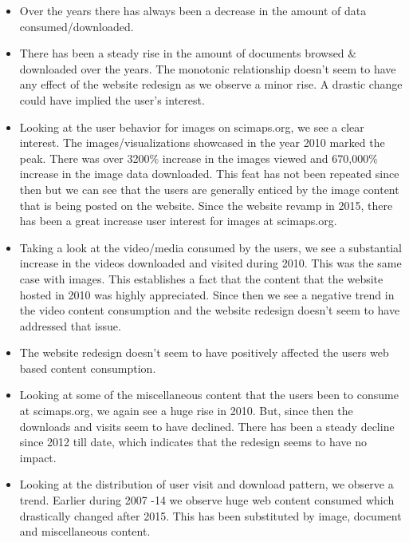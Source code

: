 \begin{itemize}
\item Over the years there has always been a decrease in the amount of data consumed/downloaded. 
\item There has been a steady rise in the amount of documents browsed $\&$ downloaded over the years. The monotonic relationship doesn’t seem to have any effect of the website redesign as we observe a minor rise. A drastic change could have implied the user’s interest. 
\item Looking at the user behavior for images on scimaps.org, we see a clear interest. The images/visualizations showcased in the year 2010 marked the peak. There was over 3200$\%$ increase in the images viewed and 670,000$\%$ increase in the image data downloaded. This feat has not been repeated since then but we can see that the users are generally enticed by the image content that is being posted on the website. Since the website revamp in 2015, there has been a great increase user interest for images at scimaps.org.
\item  Taking a look at the video/media consumed by the users, we see a substantial increase in the videos downloaded and visited during 2010. This was the same case with images. This establishes a fact that the content that the website hosted in 2010 was highly appreciated. Since then we see a negative trend in the video content consumption and the website redesign doesn’t seem to have addressed that issue.
\item The website redesign doesn’t seem to have positively affected the users web based content consumption. 
\item Looking at some of the miscellaneous content that the users been to consume at scimaps.org, we again see a huge rise in 2010. But, since then the downloads and visits seem to have declined. There has been a steady decline since 2012 till date, which indicates that the redesign seems to have no impact.
\item Looking at the distribution of user visit and download pattern, we observe a trend. Earlier during 2007 -14 we observe huge web content consumed which drastically changed after 2015. This has been substituted by image, document and miscellaneous content.
\end{itemize}
